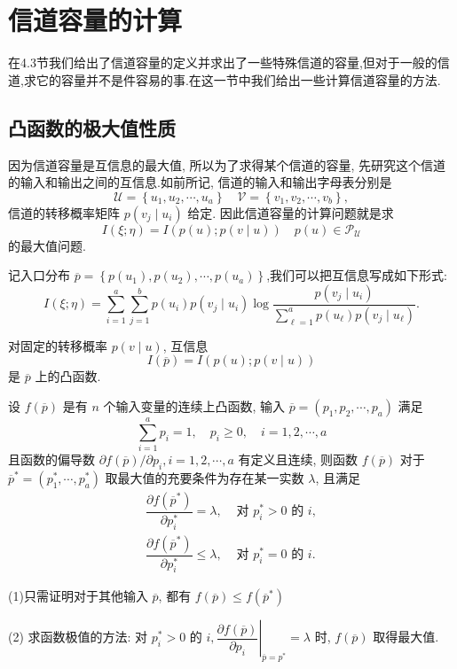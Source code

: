 \section{信道容量的计算}

在4.3节我们给出了信道容量的定义并求出了一些特殊信道的容量,但对于一般的信道,求它的容量并不是件容易的事.在这一节中我们给出一些计算信道容量的方法.

\subsection{凸函数的极大值性质}

因为信道容量是互信息的最大值, 所以为了求得某个信道的容量, 先研究这个信道的输入和输出之间的互信息.如前所记, 信道的输入和输出字母表分别是
$$
\mathscr{U}=\left\{u_{1}, u_{2}, \cdots, u_{a}\right\} \quad \mathscr{V}=\left\{v_{1}, v_{2}, \cdots, v_{b}\right\},
$$
信道的转移概率矩阵 $ p\left(v_{j} \mid u_{i}\right) $ 给定. 因此信道容量的计算问题就是求
$$
I(\xi ; \eta)=I(p(u) ; p(v \mid u)) \quad p(u) \in \mathscr{P}_{\mathscr{U}}
$$
的最大值问题.

记入口分布 $ \overline{p}=\left\{p\left(u_{1}\right), p\left(u_{2}\right), \cdots, p\left(u_{a}\right)\right\} $,我们可以把互信息写成如下形式:
$$
I(\xi ; \eta)=\sum_{i=1}^{a} \sum_{j=1}^{b} p\left(u_{i}\right) p\left(v_{j} \mid u_{i}\right) \log \frac{p\left(v_{j} \mid u_{i}\right)}{\sum\limits_{\ell=1}^{a} p\left(u_{\ell}\right) p\left(v_{j} \mid u_{\ell}\right)} .
$$

\begin{lemma}
    对固定的转移概率 $ p(v \mid u) $, 互信息
$$
I(\overline{p})=I(p(u) ; p(v \mid u))
$$
是 $ \overline{p} $ 上的凸函数.
\end{lemma}
\begin{lemma}
    设 $ f(\overline{p}) $ 是有 $ n $ 个输入变量的连续上凸函数, 输入 $  \overline{p}=\left(p_{1}, p_{2}, \cdots, p_{a}\right) $ 满足
$$
\sum_{i=1}^{a} p_{i}=1, \quad p_{i} \geq 0, \quad i=1,2, \cdots, a
$$
且函数的偏导数 $ \partial f(\overline{p}) / \partial p_{i}, i=1,2, \cdots, a $ 有定义且连续, 则函数 $ f(\overline{p}) $ 对于 $ \overline{p}^{*}=\left(p_{1}^{*}, \cdots, p_{a}^{*}\right) $ 取最大值的充要条件为存在某一实数 $ \lambda $, 且满足
$$
\begin{array}{ll}
\dfrac{\partial f\left(\overline{p}^{*}\right)}{\partial p_{i}^{*}}=\lambda, & \text { 对 } p_{i}^{*}>0 \text { 的 } i, \\
\dfrac{\partial f\left(\overline{p}^{*}\right)}{\partial p_{i}^{*}} \leq \lambda, & \text { 对 } p_{i}^{*}=0 \text { 的 } i .
\end{array}
$$
\end{lemma}
\begin{remark}

(1)只需证明对于其他输入 $ \overline{p} $, 都有 $ f(\overline{p}) \leq f\left(\overline{p}^{*}\right) $
    
(2) 求函数极值的方法: 对 $ p_{i}^{*}>0 $ 的 $ i,\left.\dfrac{\partial f(\overline{p})}{\partial p_{i}}\right|_{\overline{p}=p^{*}}=\lambda $ 时, $ f(\overline{p}) $ 取得最大值.
\end{remark}


